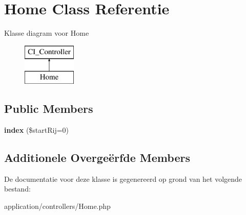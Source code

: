 \hypertarget{class_home}{}\section{Home Class Referentie}
\label{class_home}
Klasse diagram voor Home\begin{figure}[H]
\begin{center}
\leavevmode
\includegraphics[height=2.000000cm]{class_home}
\end{center}
\end{figure}
\subsection*{Public Members}
\begin{DoxyCompactItemize}
\item 
\mbox{\label{class_home_aa05469d69d03cc799a38b3882c8b2917}} 
{\bfseries index} (\$start\+Rij=0)
\end{DoxyCompactItemize}
\subsection*{Additionele Overge\"{e}rfde Members}


De documentatie voor deze klasse is gegenereerd op grond van het volgende bestand\+:\begin{DoxyCompactItemize}
\item 
application/controllers/Home.\+php\end{DoxyCompactItemize}
